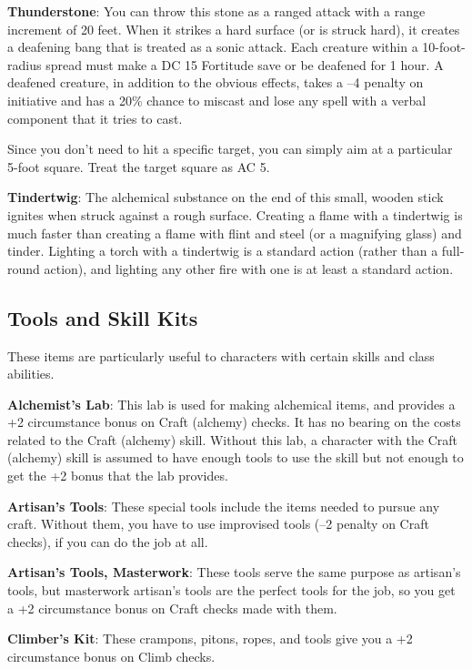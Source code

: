 \textbf{Thunderstone}: You can throw this stone as a ranged attack with a range increment of 20 feet. When it strikes a hard surface (or is struck hard), it creates a deafening bang that is treated as a sonic attack. Each creature within a 10-foot-radius spread must make a DC 15 Fortitude save or be deafened for 1 hour. A deafened creature, in addition to the obvious effects, takes a --4 penalty on initiative and has a 20\% chance to miscast and lose any spell with a verbal component that it tries to cast.
		
Since you don't need to hit a specific target, you can simply aim at a particular 5-foot square. Treat the target square as AC 5.
		
\textbf{Tindertwig}: The alchemical substance on the end of this small, wooden stick ignites when struck against a rough surface. Creating a flame with a tindertwig is much faster than creating a flame with flint and steel (or a magnifying glass) and tinder. Lighting a torch with a tindertwig is a standard action (rather than a full-round action), and lighting any other fire with one is at least a standard action.
	
\subsection{Tools and Skill Kits}

		
These items are particularly useful to characters with certain skills and class abilities.
		
\textbf{Alchemist's Lab}: This lab is used for making alchemical items, and provides a +2 circumstance bonus on Craft (alchemy) checks. It has no bearing on the costs related to the Craft (alchemy) skill. Without this lab, a character with the Craft (alchemy) skill is assumed to have enough tools to use the skill but not enough to get the +2 bonus that the lab provides.
		
\textbf{Artisan's Tools}: These special tools include the items needed to pursue any craft. Without them, you have to use improvised tools (--2 penalty on Craft checks), if you can do the job at all.
		
\textbf{Artisan's Tools, Masterwork}: These tools serve the same purpose as artisan's tools, but masterwork artisan's tools are the perfect tools for the job, so you get a +2 circumstance bonus on Craft checks made with them.
		
\textbf{Climber's Kit}: These crampons, pitons, ropes, and tools give you a +2 circumstance bonus on Climb checks.
		
